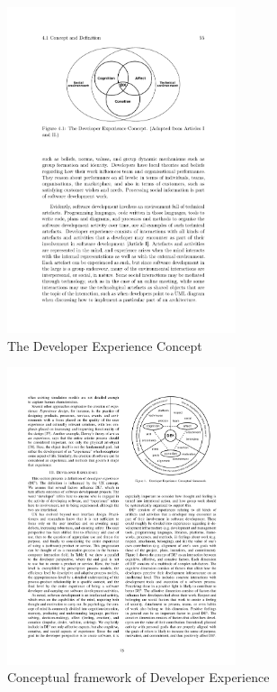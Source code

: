 \documentclass[english, 12pt, a4paper, sci, utf8, a-1b, online]{aaltothesis}
\begin{document}


\begin{figure}
  \captionsetup{width=0.6\textwidth}
  \caption{The Developer Experience Concept \citep{fagerholm-doctoral-thesis}}
  \begin{center}
    \includegraphics[width=0.6\textwidth]{dx-social-technical.pdf}
  \end{center}
  \label{figure:social-technical}
\end{figure}

\begin{figure}
  \captionsetup{width=0.6\textwidth}
  \caption{Conceptual framework of Developer Experience \citep{fagerholm-dx-concept-and-definition}}
  \begin{center}
    \includegraphics[width=0.6\textwidth]{dx-conceptual.pdf}
  \end{center}
  \label{figure:conceptual-framework}
\end{figure}
\end{document}
